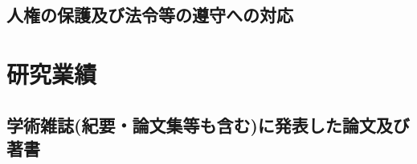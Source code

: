 \documentclass[11pt,a4paper,twoside,dvipdfmx]{jarticle}		%
\newcommand{\研究課題名}{象の卵}
\newcommand{\研究機関名}{逢坂大学}
\newcommand{\申請者氏名}{湯川秀樹}
\newcommand{\研究代表者氏名}{\申請者氏名}
\newcommand{\研究期間の最終元号年度}{34}	%
\begin{document}
\subsection{人権の保護及び法令等の遵守への対応}
\newcommand{\受け入れ研究室の選定理由}{%
	実家から研究室まで徒歩10分、自転車なら3分、電動自転車なら2分58秒、
	全力疾走すれば2分30秒、さらにヘッドスライディングすれば2分29秒で通勤可能だから。
}

\newcommand{\人権の保護及び法令等の遵守への対応}{%
	象の卵のES細胞の培養、象のクローンの生成などは行わない。
	象個体を現地から持ち出すことはないので、ワシントン条約ならびに
        生物多様性条約に抵触しない。また、組換え実験は行なわないので、
        カルタヘナ議定書にも抵触しない。
}

\section{研究業績}
\subsection{学術雑誌(紀要・論文集等も含む)に発表した論文及び著書}
\newcommand{\学術雑誌等に発表した論文または著書}{%
	
	\begin{enumerate}
		\item[](査読有り)%
		\item \underline{H. Yukawa}$^1$, J. Kara$^2$,
				``Theory of Elephant Eggs'', 
				Phys.\ Rev.\ Lett. {\bf 800}, 800-804 (2005). 
				
		\item F.~Ehrlich, \underline{H. Yukawa}$^1$,
				``You can't Lay an Egg If You're an Elephant'', 
				JofUR\\
				 ({\tt www.universalrejection.org}), {\bf N/A}, N/A (2002).

		\item[](査読なし)%
		\item Kobo Abe$^3$, \underline{H. Yukawa}$^1$, 
				``仔象は死んだ'', 
				安部公房全集, {\bf 26}, 100-200, (2004).
	\end{enumerate}
	他５報
}
\end{document}
